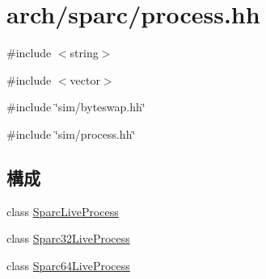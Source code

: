 \hypertarget{arch_2sparc_2process_8hh}{
\section{arch/sparc/process.hh}
\label{arch_2sparc_2process_8hh}
}
{\ttfamily \#include $<$string$>$}\par
{\ttfamily \#include $<$vector$>$}\par
{\ttfamily \#include \char`\"{}sim/byteswap.hh\char`\"{}}\par
{\ttfamily \#include \char`\"{}sim/process.hh\char`\"{}}\par
\subsection*{構成}
\begin{DoxyCompactItemize}
\item 
class \hyperlink{classSparcLiveProcess}{SparcLiveProcess}
\item 
class \hyperlink{classSparc32LiveProcess}{Sparc32LiveProcess}
\item 
class \hyperlink{classSparc64LiveProcess}{Sparc64LiveProcess}
\end{DoxyCompactItemize}
